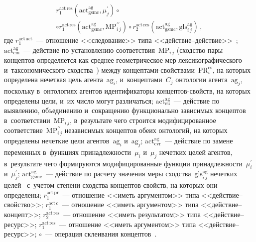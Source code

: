 \begin{multicols}{2}
\begin{multline*}
r_1^{\mathrm{act\,res}}\left (\mathrm{act^{ag}_{gsmc}},\mu_j^\prime\right)\circ\\
  \circ r_1^{\mathrm{act\,res}}\left(\mathrm{act^{ag}_{gsmc}}, 
\mathrm{MP}_{i\,j}^{\prime\prime}\right)\circ 
r_2^{\mathrm{act\,res}}\left(\mathrm{act^{ag}_{gsmc}}, 
\mathrm{gls}_{i\,j}^{\mathrm{ag}}\right)\,,
  \end{multline*}
где $r_1^{\mathrm{act\,act}}$~--- отношение <<следование>> типа  
<<дей\-ст\-вие--дей\-ст\-вие>>~\cite{3-kir}; $\mathrm{act^{ag}_{cm}}$~--- действие по 
уста\-нов\-ле\-нию соответствия~$\mathrm{MP}_{i\,j}$ (сходство пары концептов определяется как среднее 
геометрическое мер лексикографического и~таксономического сходства~\cite{11-kir}) между  
кон\-цеп\-та\-ми-свойст\-ва\-ми~$\mathrm{PR}_i^{\mathrm{cs}}$, на которых определена нечеткая цель 
агента~$\mathrm{ag}_i$, и~концептами~$C_j$ онтологии агента~$\mathrm{ag}_j$, поскольку 
в~онтологиях агентов идентификаторы  
кон\-цеп\-тов-свойств, на которых определены цели, и~их число могут различаться;   
$\mathrm{act_{cu}^{ag}}$~---
действие по выявлению, объединению и~сокращению функционально зависимых концептов 
в~соответствии~$\mathrm{MP}_{i\,j}$, в~результате чего строится модифицированное 
соответствие~$\mathrm{MP}_{i\,j}^{\prime\prime}$ независимых концептов обеих онтологий, на которых 
определены нечеткие цели агентов~$\mathrm{ag}_i$ и~$\mathrm{ag}_j$; 
$\mathrm{act^{ag}_{cvr}}$~--- действие по замене переменных в~функциях 
принадлежности~$\mu_i$ и~$\mu_j$ нечетких целей агентов, в~результате чего формируются 
модифицированные функции принадлежности~$\mu_i^\prime$ и~$\mu_j^\prime$; 
$\mathrm{act^{ag}_{gsmc}}$~--- действие по расчету значения меры 
сходства~$\mathrm{gls}^{\mathrm{ag}}_{i\,j}$ нечетких целей~\cite{10-kir} с~учетом степени сходства  
кон\-цеп\-тов-свой\-ств, на которых они определены; $r_1^{\mathrm{act\,pr}}$~--- отношение 
<<иметь аргументом>> типа  
<<дей\-ст\-вие--свой\-ст\-во>>; $r_1^{\mathrm{act}\,c}$~--- отношение <<иметь аргументом>> 
типа <<дей\-ст\-вие--кон\-цепт>>; $r_2^{\mathrm{act\,res}}$~--- отношение <<иметь 
результатом>> типа <<дей\-ст\-вие--ре\-сурс>>; $r_1^{\mathrm{act\,res}}$~--- отношение 
<<иметь аргументом>> типа  
<<дей\-ст\-вие--ре\-сурс>>;   $\circ$~--- операция склеивания концептов~\cite{3-kir}.
  

\end{multicols}
